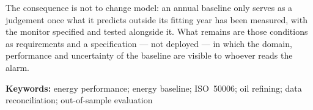 The consequence is not to change model: an annual baseline only serves as a
judgement once what it predicts outside its fitting year has been measured,
with the monitor specified and tested alongside it. What remains are those
conditions as requirements and a specification --- not deployed --- in which
the domain, performance and uncertainty of the baseline are visible to
whoever reads the alarm.

\bigskip
\noindent\textbf{Keywords:} energy performance; energy baseline;
ISO~50006; oil refining; data reconciliation; out-of-sample evaluation
